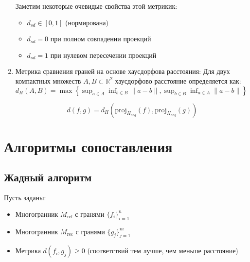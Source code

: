 \documentclass[a4paper,12pt]{article}
\begin{document}
\begin{enumerate}
        Заметим некоторые очевидые свойства этой метрикик:
        \begin{itemize}
            \item $d_{sd} \in [0,1]$ (нормирована)
            \item $d_{sd} = 0$ при полном совпадении проекций
            \item $d_{sd} = 1$ при нулевом пересечении проекций
        \end{itemize}


    \item Метрика сравнения граней на основе хаусдорфова расстояния:
        Для двух компактных множеств $A,B \subset \mathbb{R}^2$ хаусдорфово расстояние определяется как:
        $d_H(A,B) = \max\left\{\sup_{a \in A} \inf_{b \in B} \|a - b\|, \sup_{b \in B} \inf_{a \in A} \|a - b\|\right\}$

        \begin{equation}
            d(f,g) = d_H(\text{proj}_{H_{avg}}(f), \text{proj}_{H_{avg}}(g))
        \end{equation}

\end{enumerate}

\section{Алгоритмы сопоставления}

\subsection{Жадный алгоритм}
Пусть заданы:
\begin{itemize}
    \item Многогранник $M_{\text{ref}}$ с гранями $\{f_i\}_{i=1}^n$
    \item Многогранник $M_{\text{rec}}$ с гранями $\{g_j\}_{j=1}^m$
    \item Метрика $d(f_i, g_j) \geq 0$ (соответствий тем лучше, чем меньше расстояние)
\end{itemize}
\end{document}
